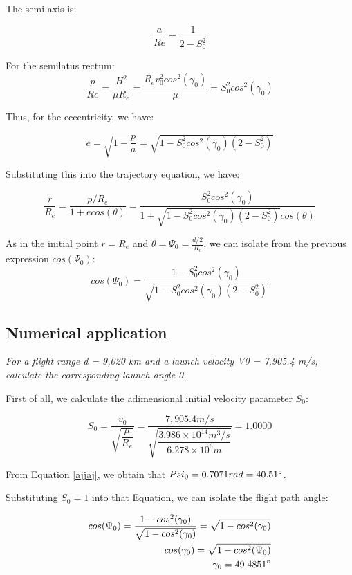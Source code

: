 The semi-axis is: 

\begin{equation}
\frac{a}{Re} = \frac{1}{2-S_0^2}
\end{equation}

For the semilatus rectum: 
\begin{equation}
\frac{p}{Re} = \frac{H^2}{\mu R_e} = \frac{R_ev_0^2cos^2(\gamma_0)}{\mu} = S_0^2 cos^2(\gamma_0)
\end{equation}

Thus, for the eccentricity, we have:

\begin{equation}
	e=\sqrt{1-\frac{p}{a}} = \sqrt{1-S_0^2 cos^2(\gamma_0)(2-S_0^2)}
\end{equation}

Substituting this into the trajectory equation, we have: 

\begin{equation}
\frac{r}{R_e} = \frac{p/R_e}{1+ e cos(\theta)	} = \frac{ S_0^2 cos^2(\gamma_0)}{1 + \sqrt{1-S_0^2 cos^2(\gamma_0)(2-S_0^2)} cos(\theta)}
\end{equation}

As in the initial point $r = R_e$ and $\theta = \Psi_0 = \frac{d/2}{R_e}$, we can isolate from the previous expression $cos(\Psi_0)$:
\begin{equation}
cos(\Psi_0) = \frac{1 - S_0^2 cos^2(\gamma_0)}{\sqrt{1-S_0^2 cos^2(\gamma_0)(2-S_0^2)} }
\label{ajjaj}
\end{equation}

\subsection{Numerical application}

\textit{For a flight range d = 9,020 km and a launch velocity V0 = 7,905.4 m/s, 	calculate the corresponding launch angle 0.}

First of all, we calculate the adimensional initial velocity parameter $S_0$: 

$$ S_0 = \frac{v_0}{\sqrt{\dfrac{\mu}{R_e}}} =\frac{7,905.4 m/s}{\sqrt{\dfrac{3.986\times 10^{14} m^3/s}{6.278 \times 10^6 m}}} = 1.0000 $$

From Equation \ref{ajjaj}, we obtain that $Psi_0 = 0.7071 rad = 40.51 \degree$.

Substituting $S_0 = 1$ into that Equation, we can isolate the flight path angle:

\begin{align}
cos(\Psi_0) = \frac{1 -  cos^2(\gamma_0)}{\sqrt{1-cos^2(\gamma_0)} } = \sqrt{1-cos^2(\gamma_0)} \\
cos(\gamma_0) = \sqrt{1-cos^2(\Psi_0)} \\
\gamma_0 = 49.4851 \degree
\end{align}